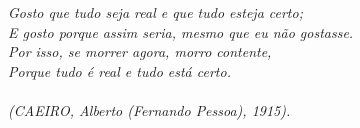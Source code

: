 
\renewcommand{\epigraphname}{EPÍGRAFE}

\begin{epigrafe}

\textit{Gosto que tudo seja real e que tudo esteja certo;\\
E gosto porque assim seria, mesmo que eu não gostasse.\\
Por isso, se morrer agora, morro contente,\\
Porque tudo é real e tudo está certo.\\\\
(CAEIRO, Alberto (Fernando Pessoa), 1915).}

\end{epigrafe}


